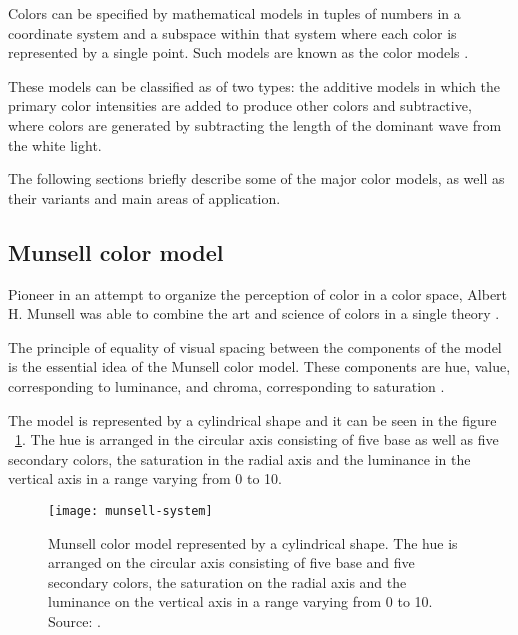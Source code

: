 Colors can be specified by mathematical models in tuples of numbers in a coordinate system and a subspace within that system where each color is represented by a single point. Such models are known as the color models \citep{gonzalez:02}.

These models can be classified as of two types: the additive models in which the primary color intensities are added to produce other colors and subtractive, where colors are generated by subtracting the length of the dominant wave from the white light.

The following sections briefly describe some of the major color models, as well as their variants and main areas of application.

\subsection{Munsell color model}
\label{sec:modelo_cores_munsell}

Pioneer in an attempt to organize the perception of color in a color space, Albert H. Munsell was able to combine the art and science of colors in a single theory \citep{konstantinos:00}.

The principle of equality of visual spacing between the components of the model is the essential idea of the Munsell color model. These components are hue, value, corresponding to luminance, and chroma, corresponding to saturation \citep{konstantinos:00}.

The model is represented by a cylindrical shape and it can be seen in the figure ~\ref{fig:munsell-system}. The hue is arranged in the circular axis consisting of five base as well as five secondary colors, the saturation in the radial axis and the luminance in the vertical axis in a range varying from 0 to 10.

\begin{figure}[!ht]
  \centering
  \texttt{[image: munsell-system]}
  \caption[Munsell color model.]{Munsell color model represented by a cylindrical shape. The hue is arranged on the circular axis consisting of five base and five secondary colors, the saturation on the radial axis and the luminance on the vertical axis in a range varying from 0 to 10. Source: \citet{rus:07}.}
  \label{fig:munsell-system} 
\end{figure}


